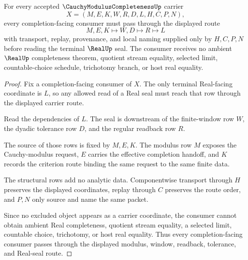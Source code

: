 \begin{theorem}
\label{thm:cauchy-modulus-completeness-real-seal-handoff}
For every accepted $\CauchyModulusCompletenessUp$ carrier
$$
X=(M,E,K,W,R,D,L,H,C,P,N),
$$
every completion-facing consumer must pass through the displayed route
$$
M,E,K \longmapsto W,D \longmapsto R \longmapsto L
$$
with transport, replay, provenance, and local naming supplied only by $H,C,P,N$ before reading the terminal $\RealUp$ seal. The consumer receives no ambient $\RealUp$ completeness theorem, quotient stream equality, selected limit, countable-choice schedule, trichotomy branch, or host real equality.
\end{theorem}
\begin{proof}
Fix a completion-facing consumer of $X$. The only terminal Real-facing coordinate is $L$, so any allowed read of a Real seal must reach that row through the displayed carrier route.

Read the dependencies of $L$. The seal is downstream of the finite-window row $W$, the dyadic tolerance row $D$, and the regular readback row $R$.

The source of those rows is fixed by $M,E,K$. The modulus row $M$ exposes the Cauchy-modulus request, $E$ carries the effective completion handoff, and $K$ records the criterion route binding the same request to the same finite data.

The structural rows add no analytic data. Componentwise transport through $H$ preserves the displayed coordinates, replay through $C$ preserves the route order, and $P,N$ only source and name the same packet.

Since no excluded object appears as a carrier coordinate, the consumer cannot obtain ambient Real completeness, quotient stream equality, a selected limit, countable choice, trichotomy, or host real equality. Thus every completion-facing consumer passes through the displayed modulus, window, readback, tolerance, and Real-seal route.
\end{proof}


